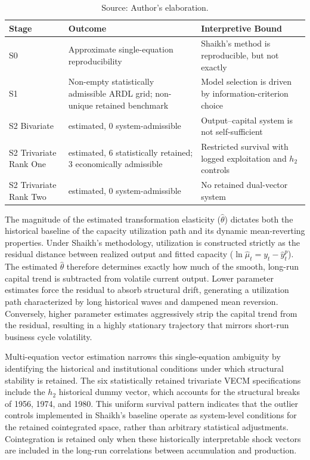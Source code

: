 \documentclass[11pt]{article}
\begin{document}
\begin{table}[H]
\centering
\caption{Cross-Stage Synthesis of the Cointegration Architecture}
\label{tab:cross_stage_synthesis}
\small
\begin{tabular}{@{}>{\raggedright\arraybackslash}p{3.2cm}>{\raggedright\arraybackslash}p{4.6cm}>{\raggedright\arraybackslash}p{5.6cm}@{}}
\toprule
Stage & Outcome & Interpretive Bound \\
\midrule
\midrule
S0 & Approximate single-equation reproducibility & Shaikh's method is reproducible, but not exactly \\
S1 & Non-empty statistically admissible ARDL grid; non-unique retained benchmark & Model selection is driven by information-criterion choice \\
S2 Bivariate & 36 estimated, 0 system-admissible & Output--capital system is not self-sufficient \\
S2 Trivariate Rank One & 36 estimated, 6 statistically retained; 3 economically admissible & Restricted survival with logged exploitation and $h_2$ controls \\
S2 Trivariate Rank Two & 36 estimated, 0 system-admissible & No retained dual-vector system \\
\bottomrule
\end{tabular}
\caption*{Source: Author's elaboration.}
\end{table}

The magnitude of the estimated transformation elasticity ($\hat{\theta}$) dictates both the historical baseline of the capacity utilization path and its dynamic mean-reverting properties. Under Shaikh's methodology, utilization is constructed strictly as the residual distance between realized output and fitted capacity ($\ln \hat{\mu}_t = y_t - \hat{y}^p_t$). The estimated $\hat{\theta}$ therefore determines exactly how much of the smooth, long-run capital trend is subtracted from volatile current output. Lower parameter estimates force the residual to absorb structural drift, generating a utilization path characterized by long historical waves and dampened mean reversion. Conversely, higher parameter estimates aggressively strip the capital trend from the residual, resulting in a highly stationary trajectory that mirrors short-run business cycle volatility. 

Multi-equation vector estimation narrows this single-equation ambiguity by identifying the historical and institutional conditions under which structural stability is retained. The six statistically retained trivariate VECM specifications include the $h_2$ historical dummy vector, which accounts for the structural breaks of 1956, 1974, and 1980. This uniform survival pattern indicates that the outlier controls implemented in Shaikh's baseline operate as system-level conditions for the retained cointegrated space, rather than arbitrary statistical adjustments. Cointegration is retained only when these historically interpretable shock vectors are included in the long-run correlations between accumulation and production.
\end{document}
